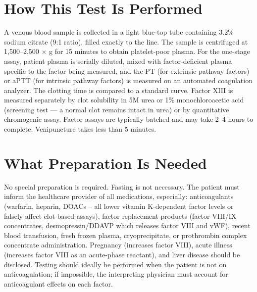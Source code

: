 \section*{How This Test Is Performed}
A venous blood sample is collected in a light blue-top tube containing 3.2\% sodium citrate (9:1 ratio), filled exactly to the line. The sample is centrifuged at 1,500--2,500 $\times$ g for 15 minutes to obtain platelet-poor plasma. For the one-stage assay, patient plasma is serially diluted, mixed with factor-deficient plasma specific to the factor being measured, and the PT (for extrinsic pathway factors) or aPTT (for intrinsic pathway factors) is measured on an automated coagulation analyzer. The clotting time is compared to a standard curve. Factor XIII is measured separately by clot solubility in 5M urea or 1\% monochloroacetic acid (screening test --- a normal clot remains intact in urea) or by quantitative chromogenic assay. Factor assays are typically batched and may take 2--4 hours to complete. Venipuncture takes less than 5 minutes.

\section*{What Preparation Is Needed}
No special preparation is required. Fasting is not necessary. The patient must inform the healthcare provider of all medications, especially: anticoagulants (warfarin, heparin, DOACs -- all lower vitamin K-dependent factor levels or falsely affect clot-based assays), factor replacement products (factor VIII/IX concentrates, desmopressin/DDAVP which releases factor VIII and vWF), recent blood transfusion, fresh frozen plasma, cryoprecipitate, or prothrombin complex concentrate administration. Pregnancy (increases factor VIII), acute illness (increases factor VIII as an acute-phase reactant), and liver disease should be disclosed. Testing should ideally be performed when the patient is not on anticoagulation; if impossible, the interpreting physician must account for anticoagulant effects on each factor.

